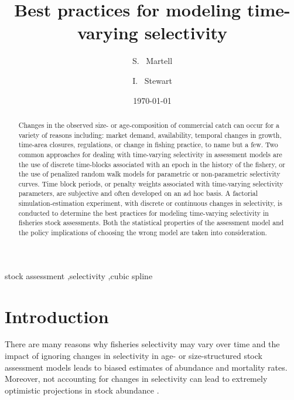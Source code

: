 \documentclass[review,letterpaper,10pt,authoryear]{elsarticle}
\title{Best practices for modeling time-varying selectivity}
\author[sm]{S. ~Martell\corref{cor1}}
\author[is]{I. ~Stewart}
\date{\today}
\begin{document}
	\linenumbers


	
	
	
	\begin{abstract}

    Changes in the observed size- or age-composition of commercial catch can occur for a variety of reasons including: market demand, availability, temporal changes in growth, time-area closures, regulations, or change in fishing practice, to name but a few.  Two common approaches for dealing with time-varying selectivity in assessment models are the use of discrete time-blocks associated with an epoch in the history of the fishery, or the use of penalized random walk models for parametric or non-parametric selectivity curves.  Time block periods, or penalty weights associated with time-varying selectivity parameters, are subjective and often developed on an ad hoc basis. A factorial simulation-estimation experiment, with discrete or continuous changes in selectivity, is conducted to determine the best practices for modeling time-varying selectivity in fisheries stock assessments. Both the statistical properties of the assessment model and the policy implications of choosing the wrong model are taken into consideration.

	\end{abstract}
	\begin{keyword}
		stock assessment \sep selectivity \sep cubic spline		
	\end{keyword}


	\maketitle
	
	\section*{Introduction} %
\label{sec:introduction}
There are many reasons why fisheries selectivity may vary over time and the impact of ignoring changes in selectivity in age- or size-structured stock assessment models leads to biased estimates of abundance and mortality rates.  Moreover, not accounting for changes in selectivity can lead to extremely optimistic projections in stock abundance \citep[e.g., 2J3KL cod stocks,][]{walters1996lessons}. 
\end{document}
